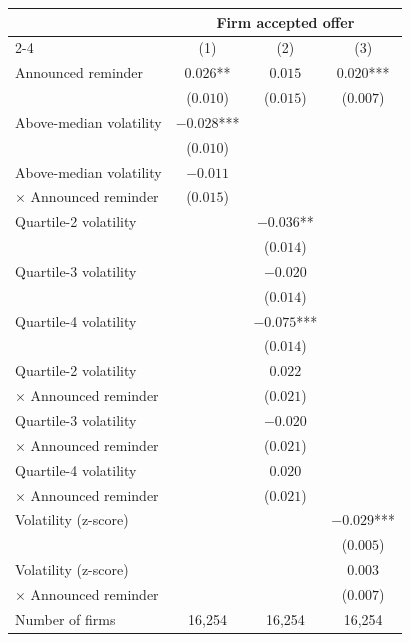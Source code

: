 \begin{tabular}[t]{lccc}
\toprule
  & \multicolumn{3}{c}{Firm accepted offer} \\
  \cmidrule(lr){2-4}
  & (1) & (2) & (3) \\
\midrule
Announced reminder & $0.026$** & $0.015$ & $0.020$*** \\
 & ($0.010$) & ($0.015$) & ($0.007$) \\
Above-median volatility & $-0.028$*** &  &  \\
 & ($0.010$) &  &  \\
Above-median volatility & $-0.011$ &  &  \\
\hspace{1em} $\times$ Announced reminder & ($0.015$) &  &  \\
Quartile-2 volatility &  & $-0.036$** &  \\
 &  & ($0.014$) &  \\
Quartile-3 volatility &  & $-0.020$ &  \\
 &  & ($0.014$) &  \\
Quartile-4 volatility &  & $-0.075$*** &  \\
 &  & ($0.014$) &  \\
Quartile-2 volatility &  & $0.022$ &  \\
\hspace{1em} $\times$ Announced reminder &  & ($0.021$) &  \\
Quartile-3 volatility &  & $-0.020$ &  \\
\hspace{1em} $\times$ Announced reminder &  & ($0.021$) &  \\
Quartile-4 volatility &  & $0.020$ &  \\
\hspace{1em} $\times$ Announced reminder &  & ($0.021$) &  \\
Volatility (z-score) &  &  & $-0.029$*** \\
 &  &  & ($0.005$) \\
Volatility (z-score) &  &  & $0.003$ \\
\hspace{1em} $\times$ Announced reminder &  &  & ($0.007$) \\
\midrule
Number of firms & 16,254 & 16,254 & 16,254 \\
\bottomrule
\end{tabular}
